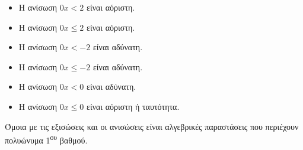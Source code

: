 \begin{multicols}{2}
\begin{itemize}
\item Η ανίσωση $ 0x<2 $ είναι αόριστη.
\item Η ανίσωση $ 0x\leq2 $ είναι αόριστη.
\item Η ανίσωση $ 0x<-2 $ είναι αδύνατη.
\item Η ανίσωση $ 0x\leq-2 $ είναι αδύνατη.
\item Η ανίσωση $ 0x<0 $ είναι αδύνατη.
\item Η ανίσωση $ 0x\leq 0 $ είναι αόριστη ή ταυτότητα.
\end{itemize}
\end{multicols}


Όμοια με τις εξισώσεις και οι ανισώσεις είναι αλγεβρικές παραστάσεις που περιέχουν πολυώνυμα 1\textsuperscript{ου} βαθμού.\\\\
\thewrhmata


